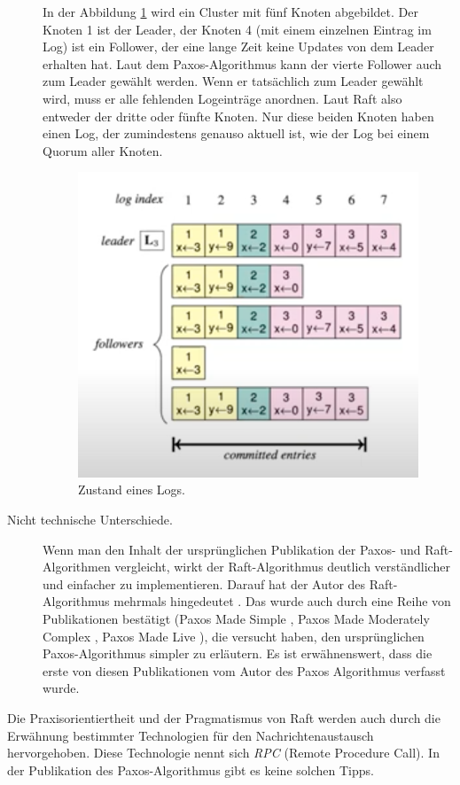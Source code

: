 \begin{description}
	In der Abbildung \ref{fig:logstate} wird ein Cluster mit fünf Knoten abgebildet. Der Knoten 1 ist der Leader, der Knoten 4 (mit einem einzelnen Eintrag im Log) ist ein Follower, der eine lange Zeit keine Updates von dem Leader erhalten hat. Laut dem Paxos-Algorithmus kann der vierte Follower auch zum Leader gewählt werden. Wenn er tatsächlich zum Leader gewählt wird, muss er alle fehlenden Logeinträge anordnen. Laut Raft also entweder der dritte oder fünfte Knoten. Nur diese beiden Knoten haben einen Log, der zumindestens genauso aktuell ist, wie der Log bei einem Quorum aller Knoten.
	
	\begin{figure}
		\centering
		\includegraphics[width=0.7\linewidth]{images/2_log_state}
		\caption{Zustand eines Logs.}
		\label{fig:logstate}
	\end{figure}
	
	\item[Nicht technische Unterschiede.] Wenn man den Inhalt der ursprünglichen Publikation der Paxos- und Raft-Algorithmen vergleicht, wirkt der Raft-Algorithmus deutlich verständlicher und einfacher zu implementieren. Darauf hat der Autor des Raft-Algorithmus mehrmals hingedeutet \cite{Ongaro14insearch}. Das wurde auch durch eine Reihe von Publikationen bestätigt (Paxos Made Simple \cite{Lamport2001paxos-made-simple}, Paxos Made Moderately Complex \cite{Renesse15paxosmade}, Paxos Made Live \cite{Chandra07paxosmade}), die versucht haben, den ursprünglichen Paxos-Algorithmus simpler zu erläutern. Es ist erwähnenswert, dass die erste von diesen Publikationen vom Autor des Paxos Algorithmus verfasst wurde.
\end{description}

Die Praxisorientiertheit und der Pragmatismus von Raft werden auch durch die Erwähnung bestimmter Technologien für den Nachrichtenaustausch hervorgehoben. Diese Technologie nennt sich \textit{RPC} (Remote Procedure Call). In der Publikation des Paxos-Algorithmus gibt es keine solchen Tipps.

